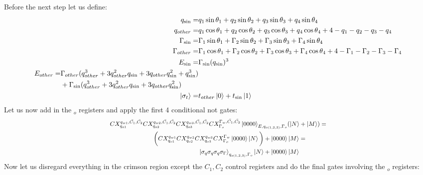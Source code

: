 Before the next step let us define:
\begin{align}
    q_{\sin} =& q_1\sin\theta_1+q_2\sin\theta_2+q_3\sin\theta_3+q_4\sin\theta_4\\
    q_{other} =& q_1\cos\theta_1+q_2\cos\theta_2+q_3\cos\theta_3+q_4\cos\theta_4+4-q_1-q_2-q_3-q_4\\
    \Gamma_{\sin} =& \Gamma_1\sin\theta_1+\Gamma_2\sin\theta_2+\Gamma_3\sin\theta_3+\Gamma_4\sin\theta_4\\
    \Gamma_{other} =& \Gamma_1\cos\theta_1+\Gamma_2\cos\theta_2+\Gamma_3\cos\theta_3+\Gamma_4\cos\theta_4+4-\Gamma_1-\Gamma_2-\Gamma_3-\Gamma_4\\
    E_{\sin} =& \Gamma_{\sin}(q_{\sin})^3\\
    \begin{split}
        E_{other} = &\Gamma_{other}(q_{other}^3+3q_{other}^2q_{\sin}+3q_{other}q_{\sin}^2+q_{\sin}^3)\\
        &+\Gamma_{\sin}(q_{other}^3+3q_{other}^2q_{\sin}+3q_{other}q_{\sin}^2)
    \end{split}\\
    \ket{\sigma_t} = &t_{other}\ket{0}+t_{\sin}\ket{1}\\
\end{align}
Let us now add in the $ _o$ registers and apply the first 4 conditional not gates:
\begin{equation}
   \resizebox{.9\hsize}{!}{$\begin{split}
        CX_{q_{o1}}^{q_{w1},\bar{C_1},\bar{C_2}}CX_{q_{o2}}^{q_{w2},\bar{C_1},\bar{C_2}}CX_{q_{o3}}^{q_{w3},\bar{C_1},\bar{C_2}}CX_{\Gamma_o}^{\Gamma_w,\bar{C_1},\bar{C_2}}
        \ket{0000}_{E,q_{o(1,2,3)},\Gamma_o}&(\ket{N}+\ket{M})=\\
        \bigg(CX_{q_{o1}}^{q_{w1}}CX_{q_{o2}}^{q_{w2}}CX_{q_{o3}}^{q_{w3}}CX_{\Gamma_o}^{\Gamma_w}
        \ket{0000}\ket{N}\bigg)+\ket{0000}&\ket{M}=\\
        \ket{\sigma_q\sigma_q\sigma_q\sigma_\Gamma}_{q_{o(1,2,3)},\Gamma_{o}}\ket{N}+\ket{0000}&\ket{M}\\
   \end{split}$}
\end{equation}
Now let us disregard everything in the crimson region except the $C_1,C_2$ control registers and do the final gates involving the $ _o$ registers:
